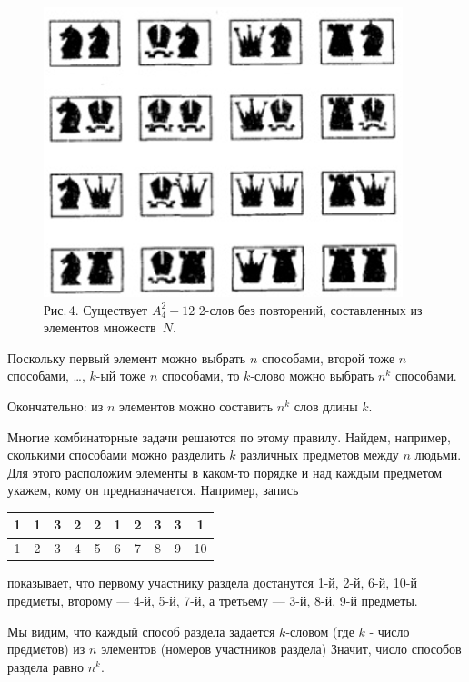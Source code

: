 \documentclass[11pt, a4paper, twocolumn]{report}
\begin{document}
\begin{figure}[t]
	\includegraphics[width=\linewidth]{second.png}
	\footnotesize
	Рис.\,4. Существует $A^2_4 - 12$ 2-слов без повторений, составленных из элементов множеств~$N$.
\end{figure}


Поскольку первый элемент можно выбрать $n$ способами, второй тоже $n$ способами, \dots, $k$-ый тоже $n$ способами, то $k$-слово можно выбрать $n^k$ способами.

Окончательно: из $n$ элементов можно составить $n^k$ слов длины $k$.

Многие комбинаторные задачи решаются по этому правилу. Найдем, например, сколькими способами можно разделить $k$ различных предметов между $n$ людьми. Для этого расположим элементы в каком-то порядке и над каждым предметом укажем, кому он предназначается. Например, запись

\vspace{2mm}
\setlength{\extrarowheight}{3 mm}
\noindent
\begin{tabular}{|c|c|c|c|c|c|c|c|c|c|}
	\hline 1 & 1 & 3 & 2 & 2 & 1 & 2 & 3 & 3 & 1 \\ [5pt]
	\hline 1 & 2 & 3 & 4 & 5 & 6 & 7 & 8 & 9 & 10 \\ [5pt]
	\hline	
\end{tabular}
\setlength{\extrarowheight}{0 mm}

\vspace{2mm}
\noindent показывает, что первому участнику раздела достанутся 1-й, 2-й, 6-й, 10-й предметы, второму --- 4-й, 5-й, 7-й, а третьему --- 3-й, 8-й, 9-й предметы.

Мы видим, что каждый способ раздела задается $k$-словом (где $k$ - число предметов) из $n$ элементов (номеров участников раздела) Значит, число способов раздела равно $n^k$.
\end{document}
